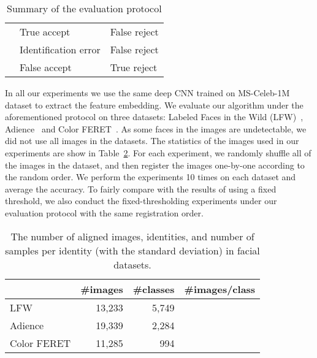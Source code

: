 \documentclass[10pt,twocolumn]{article}
\begin{document}
\begin{table}[ht]
\centering
\vspace{-10pt}
\caption{Summary of the evaluation protocol}
\label{tab:evaluation-protocol}
\begin{tabular}{lll}
\toprule
& 
&    \\ \midrule
        & True accept &  False reject \\ \midrule
  & \multirow{2}{8em}{Identification error}  &  \multirow{2}{5em}{False reject} \\
 &  &  \\ \midrule
  & \multirow{2}{8em}{False accept }  &  \multirow{2}{5em}{True reject} \\
 &  &  \\ \midrule
\end{tabular}
\end{table}
\vspace{-10pt}

In all our experiments we use the same deep CNN trained on MS-Celeb-1M~\cite{guo2016msceleb} dataset to extract the feature embedding. We evaluate our algorithm under the aforementioned protocol on three datasets: Labeled Faces in the Wild (LFW)~\cite{huang2008labeled}, Adience~\cite{eidinger2014age} and Color FERET~\cite{phillips2000feret}. As some faces in the images are undetectable, we did not use all images in the datasets. The statistics of the images used in our experiments are show in Table~\ref{tab:dataset-info}. For each experiment, we randomly shuffle all of the images in the dataset, and then register the images one-by-one according to the random order. We perform the experiments 10 times on each dataset and average the accuracy. To fairly compare with the results of using a fixed threshold, we also conduct the fixed-thresholding experiments under our evaluation protocol with the same registration order.

\begin{table}[t]
\centering
\caption{The number of aligned images, identities, and number of samples per identity (with the standard deviation) in facial datasets.} \label{tab:dataset-info}
\begin{tabular}{lrrr}
\toprule
           &\#images & \#classes & \#images/class\\ \midrule
LFW         & 13,233 & 5,749 & \\ 
Adience     & 19,339 & 2,284 & \\ 
Color FERET & 11,285 & 994   & \\ \midrule
\end{tabular}
\end{table}
\end{document}
